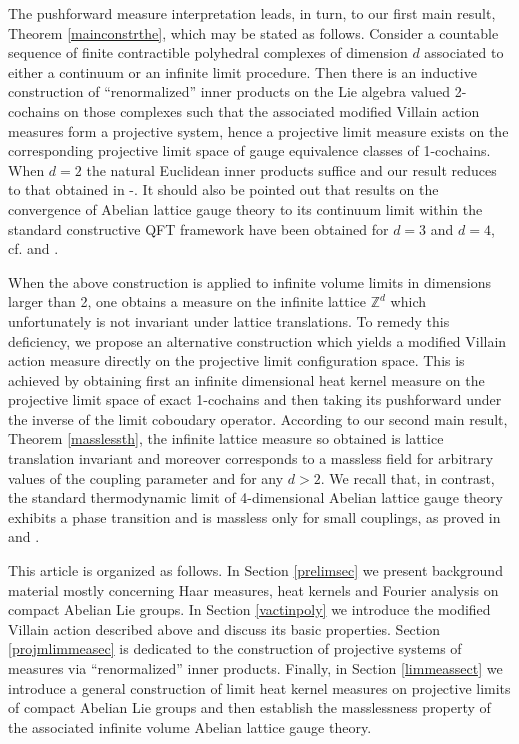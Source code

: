 \documentclass[11pt,reqno]{amsart}
\numberwithin{equation}{section}
\theoremstyle{remark}
\theoremstyle{rmdefinition}
\begin{document}
The pushforward measure interpretation leads, in turn, to our first main result, Theorem \ref{mainconstrthe}, which may be stated as follows. Consider a countable sequence of finite contractible polyhedral complexes of dimension $d$ associated to either a continuum or an infinite limit procedure. Then there is an inductive construction of ``renormalized'' inner products on the Lie algebra valued 2-cochains on those complexes such that the associated modified Villain action measures form a projective system, hence a projective limit measure exists on the corresponding projective limit space of gauge equivalence classes of 1-cochains. When $d=2$ the natural Euclidean inner products suffice and our result reduces to that obtained in \cite{VM0}-\cite{VM2}. It should also be pointed out that results on the convergence of Abelian lattice gauge theory to its continuum limit within the standard constructive QFT framework have been obtained for $d=3$ and $d=4$, cf. \cite{Gro} and \cite{Dr}.

When the above construction is applied to infinite volume limits in dimensions larger than 2, one obtains a measure on the infinite lattice $\mathbb{Z}^d$ which unfortunately is not invariant under lattice translations. To remedy this deficiency, we propose an alternative construction which yields a modified Villain action measure directly on the projective limit configuration space. This is achieved by obtaining first an infinite dimensional heat kernel measure on the projective limit space of exact 1-cochains and then taking its pushforward under the inverse of the limit coboudary operator. According to our second main result, Theorem \ref{masslessth}, the infinite lattice measure so obtained is lattice translation invariant and moreover corresponds to a massless field for arbitrary values of the coupling parameter and for any $d>2$. We recall that, in contrast, the standard thermodynamic limit of 4-dimensional Abelian lattice gauge theory exhibits a phase transition and is massless only for small couplings, as proved in \cite{OS} and \cite{FS}.

This article is organized as follows. In Section \ref{prelimsec} we present background material mostly concerning Haar measures, heat kernels and Fourier analysis on compact Abelian Lie groups. In Section \ref{vactinpoly} we introduce the modified Villain action described above and discuss its basic properties. Section \ref{projmlimmeasec} is dedicated to the construction of projective systems of measures via ``renormalized'' inner products. Finally, in Section \ref{limmeassect} we introduce a general construction of limit heat kernel measures on projective limits of compact Abelian Lie groups and then establish the masslessness property of the associated infinite volume Abelian lattice gauge theory.
\end{document}
